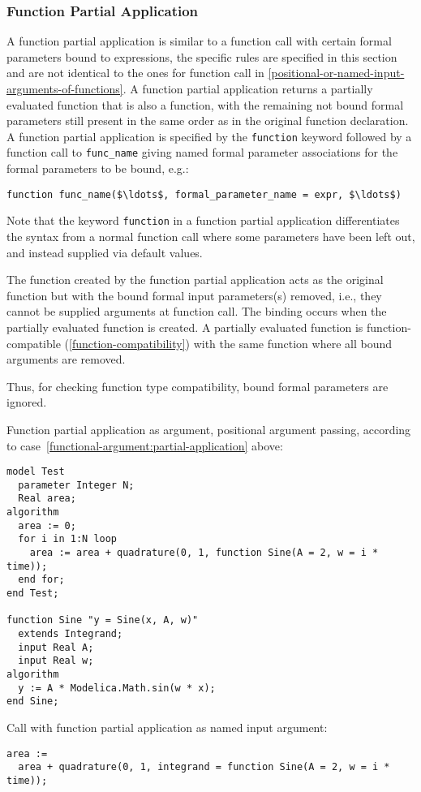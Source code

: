 \subsubsection{Function Partial Application}\label{function-partial-application}

A function partial application is similar to a function call with
certain formal parameters bound to expressions, the specific rules are
specified in this section and are not identical to the ones for function
call in \cref{positional-or-named-input-arguments-of-functions}. A function partial application returns a partially
evaluated function that is also a function, with the remaining not bound
formal parameters still present in the same order as in the original
function declaration. A function partial application is specified by the
\lstinline!function! keyword followed by a function call to \lstinline!func_name!
giving named formal parameter associations for the formal parameters to
be bound, e.g.:
\begin{lstlisting}[language=modelica]
function func_name($\ldots$, formal_parameter_name = expr, $\ldots$)
\end{lstlisting}

\begin{nonnormative}
Note that the keyword \lstinline!function! in a function partial
application differentiates the syntax from a normal function call
where some parameters have been left out, and instead supplied via
default values.
\end{nonnormative}

The function created by the function partial application acts as the original function but with the bound formal input parameters(s) removed, i.e., they cannot be supplied arguments at function call.
The binding occurs when the partially evaluated function is created.
A partially evaluated function is function-compatible (\cref{function-compatibility}) with the same function where all bound arguments are removed.

\begin{nonnormative}
Thus, for checking function type compatibility, bound formal parameters are ignored.
\end{nonnormative}

\begin{example}
Function partial application as argument, positional argument passing, according to case~\ref{functional-argument:partial-application} above:
\begin{lstlisting}[language=modelica]
model Test
  parameter Integer N;
  Real area;
algorithm
  area := 0;
  for i in 1:N loop
    area := area + quadrature(0, 1, function Sine(A = 2, w = i * time));
  end for;
end Test;

function Sine "y = Sine(x, A, w)"
  extends Integrand;
  input Real A;
  input Real w;
algorithm
  y := A * Modelica.Math.sin(w * x);
end Sine;
\end{lstlisting}
Call with function partial application as named input argument:
\begin{lstlisting}[language=modelica]
area :=
  area + quadrature(0, 1, integrand = function Sine(A = 2, w = i * time));
\end{lstlisting}
\end{example}

